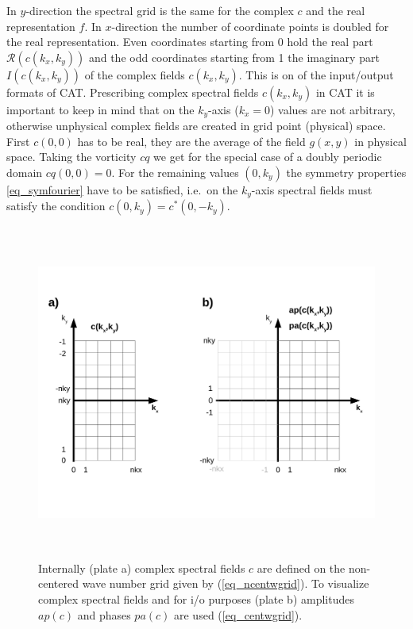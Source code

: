 In $y$-direction the spectral grid is the same for the complex $c$ and
the real representation $f$. In $x$-direction the number of coordinate
points is doubled for the real representation. Even coordinates starting
from $0$ hold the real part $\mathcal{R}(c(k_{x},k_{y}))$ and
the odd coordinates starting from 1 the imaginary part
$I(c(k_{x},k_{y}))$ of the complex fields $c(k_{x},k_{y})$.
This is on of the input/output formats of CAT. Prescribing complex spectral 
fields $c(k_{x},k_{y})$ in CAT it is important to keep in mind that on 
the $k_{y}$-axis ($k_{x} = 0$) values are not arbitrary, otherwise unphysical 
complex fields are created in grid point (physical) space. First $c(0,0)$ 
has to be real, they are the average of the field $g(x,y)$ in physical space. 
Taking the vorticity $cq$ we get for the special case of a doubly periodic 
domain $cq(0,0) = 0$. For the remaining values $(0,k_{y})$ the symmetry properties
\ref{eq_symfourier} have to be satisfied, i.e.\ on the $k_{y}$-axis
spectral fields must satisfy the condition $c(0,k_{y}) = c^{*}(0,-k_{y})$.
\begin{figure}
   \includegraphics[height=11cm]{figures/cmplx_cent_grid.pdf}
   \caption{Internally (plate a) complex spectral fields $c$ are defined on
            the non-centered wave number grid given by (\ref{eq_ncentwgrid}).
            To visualize complex spectral fields and for i/o purposes (plate b) 
            amplitudes $ap(c)$ and phases $pa(c)$ are used (\ref{eq_centwgrid}).}
   \label{fig_cspecgrid}
\end{figure}
